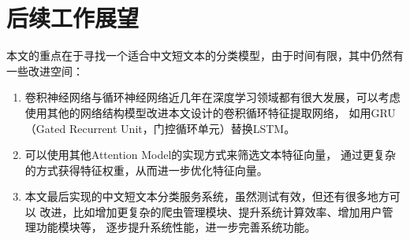 \documentclass{standalone}
\begin{document}
\section{后续工作展望}
本文的重点在于寻找一个适合中文短文本的分类模型，由于时间有限，其中仍然有一些改进空间：
\begin{enumerate}
    \item 卷积神经网络与循环神经网络近几年在深度学习领域都有很大发展，可以考虑
    使用其他的网络结构模型改进本文设计的卷积循环特征提取网络，
    如用GRU（Gated Recurrent Unit，门控循环单元）替换LSTM。
    \item 可以使用其他Attention Model的实现方式来筛选文本特征向量，
    通过更复杂的方式获得特征权重，从而进一步优化特征向量。
    \item 本文最后实现的中文短文本分类服务系统，虽然测试有效，但还有很多地方可以
    改进，比如增加更复杂的爬虫管理模块、提升系统计算效率、增加用户管理功能模块等，
    逐步提升系统性能，进一步完善系统功能。
\end{enumerate}
\end{document}
